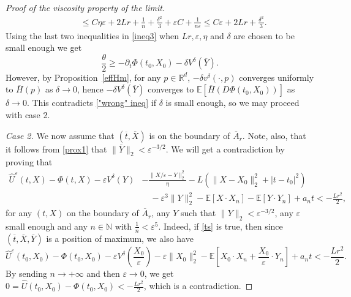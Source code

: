 \documentclass[reqno,11pt]{amsart}
\numberwithin{equation}{section}
\newcommand{\be}{\begin{equation}}
\newcommand{\ee}{\end{equation}}
\newcommand{\R}{\mathbb{R}} %
\newcommand{\e}{\varepsilon}
\newcommand{\nd}{\noindent}
\renewcommand{\hat}{\widehat}
\begin{document}
\begin{proof}[Proof of the viscosity property of the limit]
\begin{align*}
    &\hspace{1cm}\le C\eta\e+ 2Lr+\frac{1}{n}+\frac{\delta^2}{3}+\e C+\frac{1}{n\e}\le C\e+2Lr+\frac{\delta^2}{3}.
    \end{align*}
    Using the last two inequalities in \eqref{ineq3} when $Lr, \e,\eta$ and $\delta$ are chosen to be small enough we get
    $$\frac{\theta}{2}\ge -\partial_t\Phi(t_0,X_0)-\delta V^\delta(\overline{Y}).$$
    However, by Proposition~\ref{effHm}, for any $p\in \R^d$, $-\delta v^\delta(\cdot,p)$ converges uniformly to $\overline{H}(p)$ as $\delta\to 0$, hence $-\delta V^\delta(\overline{Y})$ converges to $\mathbb{E}[\overline{H}(D\Phi(t_0,X_0))]$ as $\delta\to0$.
    This contradicts \eqref{"wrong" ineq} if $\delta$ is small enough, so we may proceed with case 2.
    \vspace{2mm}

    \nd
    \textit{Case 2.} We now assume that $(\overline{t},\overline{X})$ is on the boundary of $\overline{A}_r$. Note, also, that it follows from \eqref{prox1} that $\|\overline{Y}\|_2<\e^{-3/2}$. We will get a contradiction by proving that
    \be\label{ts}
    \begin{split}
\hat{U}^\e(t,X)-\Phi(t,X)-\e V^\delta(Y)&-\frac{\|X/\e-Y\|_2^2}{\eta}-L\left(\|X-X_0\|_2^2+|t-t_0|^2\right)\\
&\quad-\e^3\|Y\|_2^2-\mathbb{E}[X\cdot X_n]-\mathbb{E}[Y\cdot Y_n]+a_nt<-\frac{Lr^2}{2},
    \end{split}
    \ee
    for any $(t,X)$ on the boundary of $\overline{A}_r$, any $Y$ such that $\|Y\|_2<\e^{-3/2}$, any $\e$ small enough and any $n\in\mathbb{N}$ with $\frac{1}{n}<\e^5$. Indeed, if \eqref{ts} is true, then since $(\overline{t},\overline{X},\overline{Y})$ is a position of maximum, we also have
    $$\hat{U}^\e(t_0,X_0)-\Phi(t_0,X_0)-\e V^\delta\left(\frac{X_0}{\e}\right)-\e\|X_0\|_2^2-\mathbb{E}\left[X_0\cdot X_n+\frac{X_0}{\e}\cdot Y_n\right] +a_nt<-\frac{Lr^2}{2}.$$
    By sending $n\to +\infty$ and then $\e\to 0$, we get $0=\hat{U}(t_0,X_0)-\Phi(t_0,X_0)<-\frac{Lr^2}{2}$, which is a contradiction.
    \vspace{1mm}


\end{proof}
\end{document}
